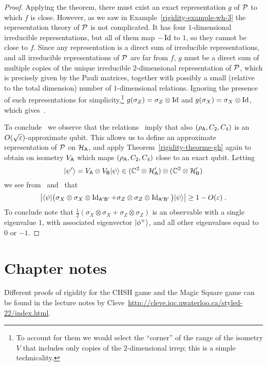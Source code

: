 \begin{proof}
Applying the theorem, there must exist an exact representation $g$ of $\mathcal{P}$ to which $f$ is close. However, as we saw in Example~\ref{rigidity-example-wh-3} the representation theory of $\mathcal{P}$ is not complicated. It has four $1$-dimensional irreducible representations, but all of them map $-\mathop{\rm Id}\nolimits$ to $1$, so they cannot be close to $f$. Since any representation is a direct sum of irreducible representations, and all irreducible representations of $\mathcal{P}$ are far from $f$, $g$ must be a direct sum of multiple copies of the unique irreducible $2$-dimensional representation of $\mathcal{P}$, which is precisely given by the Pauli matrices, together with possibly a small (relative to the total dimension) number of $1$-dimensional relations. Ignoring the presence of such representations for simplicity,\footnote{To account for them we would select the ``corner'' of the range of the isometry $V$ that includes only copies of the $2$-dimensional irrep; this is a simple technicality.} $g(\sigma_Z) = \sigma_Z \otimes \mathop{\rm Id}\nolimits$ and $g(\sigma_X) = \sigma_X \otimes \mathop{\rm Id}\nolimits$, which gives~. 

To conclude~ we observe that the relations~ imply that also $(\rho_{\textsf{A}},C_2,C_4)$ is an $O(\sqrt{\varepsilon})$-approximate qubit. This allows us to define an approximate representation of $\mathcal{P}$ on $\mathcal{H}_{\textsf{A}}$, and apply Theorem~\ref{rigidity-theorme-gh} again to obtain on isometry $V_{\textsf{A}}$ which maps $(\rho_{\textsf{A}},C_2,C_4)$ close to an exact qubit. Letting 
\[ |\psi'\rangle = V_{\textsf{A}} \otimes V_{\textsf{B}} |\psi\rangle \in (\mathbb{C}^2 \otimes \mathcal{H}_{\textsf{A}}')\otimes (\mathbb{C}^2 \otimes \mathcal{H}_{\textsf{B}}') \]
we see from~ and~ that 
\[\big| \langle\psi| \big(\sigma_X \otimes \sigma_X \otimes \mathop{\rm Id}\nolimits_{{\textsf{A}}'{\textsf{B}}'} + \sigma_Z \otimes \sigma_Z \otimes \mathop{\rm Id}\nolimits_{{\textsf{A}}'{\textsf{B}}'} \big) |\psi\rangle\big| \geq 1-O({\varepsilon})\;.\]
To conclude note that $\frac{1}{2}(\sigma_X \otimes \sigma_X + \sigma_Z \otimes \sigma_Z )$ is an observable with a single eigenvalue $1$, with associated eigenvector $|\phi^+\rangle$, and all other eigenvalues equal to $0$ or $-1$. 
\end{proof}


\section{Chapter notes}
\label{section-rigidity-notes}

Different proofs of rigidity for the CHSH game and the Magic Square game can be found in the lecture notes by Cleve~\url{http://cleve.iqc.uwaterloo.ca/styled-22/index.html}. 








